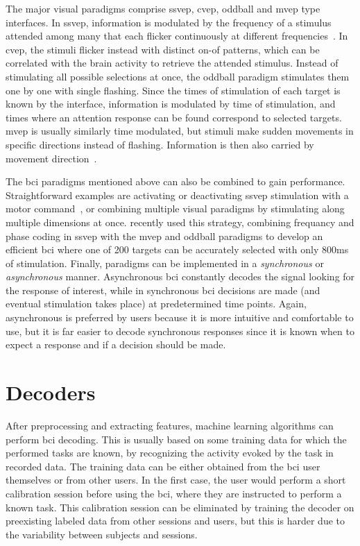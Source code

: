 The major visual paradigms comprise
\ac{ssvep}, \ac{cvep}, oddball and \ac{mvep} type interfaces.
In \ac{ssvep}, information is modulated by the frequency of a stimulus attended
among many that each flicker continuously at different
frequencies~\cite{Chen2021}.
In \ac{cvep}, the stimuli flicker instead with distinct on-of patterns, which can
be correlated with the brain activity to retrieve the attended stimulus.
Instead of stimulating all possible selections at once, the oddball paradigm
stimulates them one by one with single flashing.
Since the times of stimulation of each target is known by the interface,
information is modulated by time of stimulation, and times where an attention
response can be found correspond to selected targets.
\Ac{mvep} is usually similarly time modulated, but stimuli make sudden
movements in specific directions instead of flashing.
Information is then also carried by movement
direction~\cite{Libert2021a,Libert2022}.


The \ac{bci} paradigms mentioned above can also be combined to gain performance.
Straightforward examples are activating or deactivating \ac{ssvep} stimulation
with a motor command~\cite{Neeling2019}, or combining multiple visual paradigms by stimulating
along multiple dimensions at once.
\textcite{Han2023} recently used this strategy, combining frequancy and phase
coding in \ac{ssvep} with the \ac{mvep} and oddball paradigms to develop an
efficient \ac{bci} where one of 200 targets can be accurately selected with
only 800ms of stimulation.
Finally, paradigms can be implemented in a \emph{synchronous} or
\emph{asynchronous} manner.
Asynchronous \ac{bci} constantly decodes the signal looking for the response of
interest, while in synchronous \ac{bci} decisions are made (and eventual
stimulation takes place) at predetermined time points.
Again, asynchronous is preferred by users because it is more intuitive and
comfortable to use, but it is far easier to decode synchronous responses since
it is known when to expect a response and if a decision should be made.

\section{Decoders}
\label{sec:bci-decoding}

After preprocessing and extracting features, machine learning algorithms can perform \ac{bci}
decoding.
This is usually based on
some training data for which the performed tasks are known, by recognizing the
activity evoked by the task in recorded data.
The training data can be either obtained from the \ac{bci} user themselves or from
other users.
In the first case, the user would perform a short calibration session before
using the \ac{bci}, where they are instructed to perform a known task.
This calibration session can be eliminated by training the decoder on
preexisting labeled data from other sessions and users, but this is harder due
to the variability between subjects and sessions.

